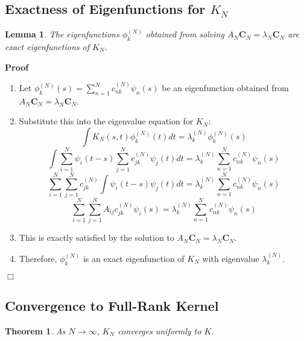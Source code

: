 \documentclass{article}
\newenvironment{proof}{\noindent\textbf{Proof\ }}{\hspace*{\fill}$\Box$\medskip}
\newtheorem{lemma}{Lemma}
\newtheorem{theorem}{Theorem}
\begin{document}
\subsection{Exactness of Eigenfunctions for $K_N$}

\begin{lemma}
  The eigenfunctions $\phi_k^{(N)}$ obtained from solving $A_N \mathbf{C}_N =
  \lambda_N \mathbf{C}_N$ are exact eigenfunctions of $K_N$.
\end{lemma}

\begin{proof}
  \begin{enumerate}
    \item Let $\phi_k^{(N)} (s) = \sum_{n = 1}^N c_{nk}^{(N)} \psi_n (s)$ be
    an eigenfunction obtained from $A_N \mathbf{C}_N = \lambda_N
    \mathbf{C}_N$.
    
    \item Substitute this into the eigenvalue equation for $K_N$:
    \[ \int K_N (s, t) \phi_k^{(N)} (t) dt = \lambda_k^{(N)} \phi_k^{(N)} (s)
    \]
    \[ \int \sum_{i = 1}^N \psi_i  (t - s)  \sum_{j = 1}^N c_{jk}^{(N)} \psi_j
       (t) dt = \lambda_k^{(N)}  \sum_{n = 1}^N c_{nk}^{(N)} \psi_n (s) \]
    \[ \sum_{i = 1}^N \sum_{j = 1}^N c_{jk}^{(N)}  \int \psi_i  (t - s) \psi_j
       (t) dt = \lambda_k^{(N)}  \sum_{n = 1}^N c_{nk}^{(N)} \psi_n (s) \]
    \[ \sum_{i = 1}^N \sum_{j = 1}^N A_{ij} c_{jk}^{(N)} \psi_i (s) =
       \lambda_k^{(N)}  \sum_{n = 1}^N c_{nk}^{(N)} \psi_n (s) \]
    \item This is exactly satisfied by the solution to $A_N \mathbf{C}_N =
    \lambda_N \mathbf{C}_N$.
    
    \item Therefore, $\phi_k^{(N)}$ is an exact eigenfunction of $K_N$ with
    eigenvalue $\lambda_k^{(N)}$.
  \end{enumerate}
\end{proof}

\subsection{Convergence to Full-Rank Kernel}

\begin{theorem}
  As $N \to \infty$, $K_N$ converges uniformly to $K$.
\end{theorem}
\end{document}
